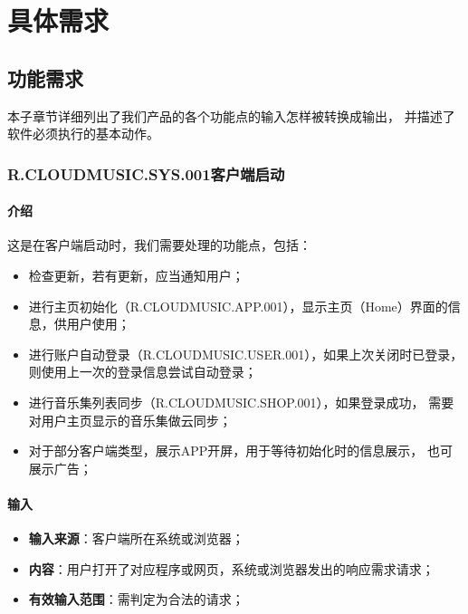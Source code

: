 
\chapter{具体需求}

\section{功能需求}

本子章节详细列出了我们产品的各个功能点的输入怎样被转换成输出，
	并描述了软件必须执行的基本动作。

\subsection{R.CLOUDMUSIC.SYS.001客户端启动}
\subsubsection{介绍}
	这是在客户端启动时，我们需要处理的功能点，包括：
	\begin{itemize}
		\item 检查更新，若有更新，应当通知用户；
		\item 进行主页初始化（R.CLOUDMUSIC.APP.001），显示主页（Home）界面的信息，供用户使用；
		\item 进行账户自动登录（R.CLOUDMUSIC.USER.001），如果上次关闭时已登录，
			则使用上一次的登录信息尝试自动登录；
		\item 进行音乐集列表同步（R.CLOUDMUSIC.SHOP.001），如果登录成功，
			需要对用户主页显示的音乐集做云同步；
		\item 对于部分客户端类型，展示APP开屏，用于等待初始化时的信息展示，
			也可展示广告；
	\end{itemize}
\subsubsection{输入}
	\begin{itemize}
		\item \textbf{输入来源}：客户端所在系统或浏览器；
		\item \textbf{内容}：用户打开了对应程序或网页，系统或浏览器发出的响应需求请求；
		\item \textbf{有效输入范围}：需判定为合法的请求；
	\end{itemize}
